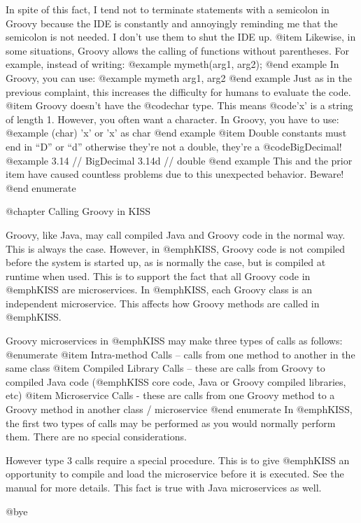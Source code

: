 In spite of this fact, I tend not to terminate statements with a
semicolon in Groovy because the IDE is constantly and annoyingly
reminding me that the semicolon is not needed.  I don't use them to
shut the IDE up.
@item   
Likewise, in some situations, Groovy allows the calling of
functions without parentheses.  For example, instead of writing:
@example   
      mymeth(arg1, arg2);
@end example
   In Groovy, you can use:
@example
      mymeth arg1, arg2
@end example
Just as in the previous complaint, this increases the difficulty
for humans to evaluate the code.
@item
Groovy doesn't have the @code{char} type.  This means @code{'x'} is a string of
length 1.  However, you often want a character.  In Groovy, you
have to use:
@example   
      (char) 'x'
        or
      'x' as char
@end example
@item
Double constants must end in ``D'' or ``d'' otherwise they're not a double,
they're a @code{BigDecimal}!
@example
    3.14  // BigDecimal
    3.14d // double
@end example
This and the prior item have caused countless problems due to this unexpected
behavior.  Beware!
@end enumerate    

@chapter Calling Groovy in KISS

Groovy, like Java, may call compiled Java and Groovy code in the
normal way.  This is always the case.  However, in @emph{KISS}, Groovy
code is not compiled before the system is started up, as is normally
the case, but is compiled at runtime when used.  This is to support
the fact that all Groovy code in @emph{KISS} are microservices.
In @emph{KISS}, each Groovy class is an independent microservice.
This affects how Groovy methods are called in @emph{KISS}.

Groovy microservices in @emph{KISS} may make three types of calls as follows:
@enumerate
@item
Intra-method Calls -- calls from one method to another in the same class
@item
Compiled Library Calls -- these are calls from Groovy to compiled Java
code (@emph{KISS} core code, Java or Groovy compiled libraries, etc)
@item 
Microservice Calls - these are calls from one Groovy method to a Groovy
method in another class / microservice
@end enumerate
In @emph{KISS}, the first two types of calls may be performed as you would normally
perform them.  There are no special considerations.

However type 3 calls require a special procedure.  This is to give @emph{KISS}
an opportunity to compile and load the microservice before it is executed.
See the manual for more details.  This fact is true with Java microservices as well.

    

@bye

